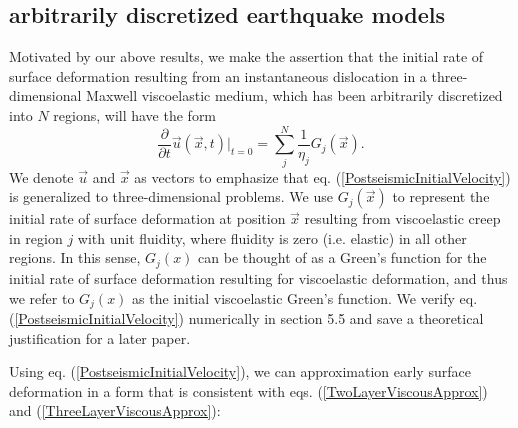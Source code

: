 \documentclass[extra]{gji}
\begin{document}
\subsection{arbitrarily discretized earthquake models}
Motivated by our above results, we make the assertion that the initial
rate of surface deformation resulting from an instantaneous
dislocation in a three-dimensional Maxwell viscoelastic
medium, which has been arbitrarily discretized into $N$ regions, will
have the form
\begin{equation}\label{PostseismicInitialVelocity}
  \frac{\partial}{\partial t}\vec{u}(\vec{x},t)\big|_{t=0} = \sum_j^N\frac{1}{\eta_j}G_j(\vec{x}).
\end{equation}
We denote $\vec{u}$ and $\vec{x}$ as vectors to emphasize that
eq. (\ref{PostseismicInitialVelocity}) is generalized to
three-dimensional problems.  We use $G_j(\vec{x})$ to represent the
initial rate of surface deformation at position $\vec{x}$ resulting
from viscoelastic creep in region $j$ with unit fluidity, where
fluidity is zero (i.e. elastic) in all other regions.  In this sense,
$G_j(x)$ can be thought of as a Green's function for the initial rate
of surface deformation resulting for viscoelastic deformation, and
thus we refer to $G_j(x)$ as the initial viscoelastic Green's
function.  We verify eq. (\ref{PostseismicInitialVelocity})
numerically in section 5.5 and save a theoretical justification for a
later paper.

Using eq. (\ref{PostseismicInitialVelocity}), we can approximation
early surface deformation in a form that is consistent with
eqs. (\ref{TwoLayerViscousApprox}) and
(\ref{ThreeLayerViscousApprox}):
\end{document}
